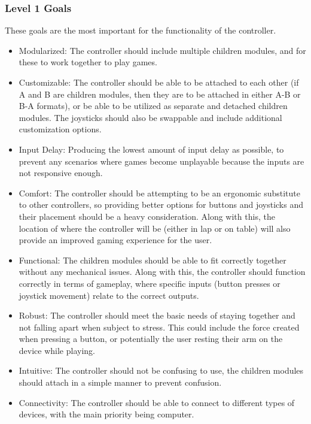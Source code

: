 \documentclass[a4]{article}
\begin{document}
\subsubsection{Level 1 Goals}
These goals are the most important for the functionality of the controller.
\begin{itemize}
	\item \textcolor{McMasterMaroon}{Modularized}: The controller should include multiple children modules, and for these to work together to play games.
	\item \textcolor{McMasterMaroon}{Customizable}: The controller should be able to be attached to each other (if A and B are children modules, then they are to be attached in either A-B or B-A formats), or be able to be utilized as separate and detached children modules.
	      The joysticks should also be swappable and include additional customization options.
	\item \textcolor{McMasterMaroon}{Input Delay}: Producing the lowest amount of input delay as possible, to prevent any scenarios where games become unplayable because the inputs are not responsive enough.
	\item \textcolor{McMasterMaroon}{Comfort}: The controller should be attempting to be an ergonomic substitute to other controllers, so providing better options for buttons and joysticks and their placement should be a heavy consideration.
	      Along with this, the location of where the controller will be (either in lap or on table) will also provide an improved gaming experience for the user.
	\item \textcolor{McMasterMaroon}{Functional}: The children modules should be able to fit correctly together without any mechanical issues. Along with this, the controller should function correctly in terms of gameplay, where specific inputs (button presses or joystick movement) relate to the correct outputs.
	\item \textcolor{McMasterMaroon}{Robust}: The controller should meet the basic needs of staying together and not falling apart when subject to stress. This could include the force created when pressing a button, or potentially the user resting their arm on the device while playing.
	\item \textcolor{McMasterMaroon}{Intuitive}: The controller should not be confusing to use, the children modules should attach in a simple manner to prevent confusion.
	\item \textcolor{McMasterMaroon}{Connectivity}: The controller should be able to connect to different types of devices, with the main priority being computer.
\end{itemize}
\end{document}
